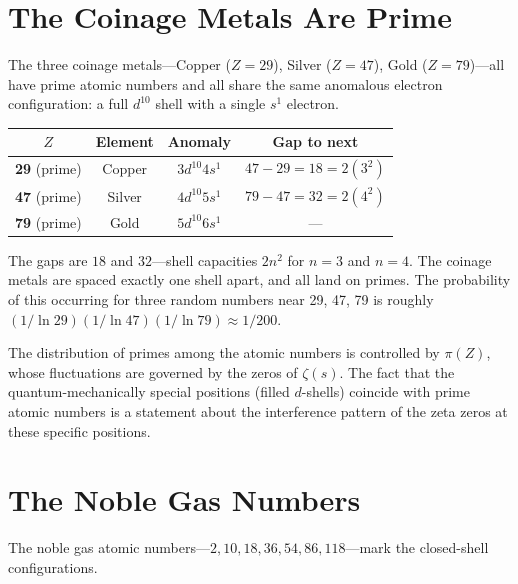 \documentclass[11pt,a4paper]{article}
\theoremstyle{definition}
\begin{document}
\section{The Coinage Metals Are Prime}
\label{sec:coinage}

The three coinage metals---Copper ($Z = 29$), Silver ($Z = 47$),
Gold ($Z = 79$)---all have prime atomic numbers and all share the
same anomalous electron configuration: a full $d^{10}$ shell with
a single $s^1$ electron.

\begin{center}
\begin{tabular}{@{}cccc@{}}
\toprule
$Z$ & Element & Anomaly & Gap to next \\
\midrule
\textbf{29} (prime) & Copper & $3d^{10}4s^1$ & $47 - 29 = 18 = 2(3^2)$ \\
\textbf{47} (prime) & Silver & $4d^{10}5s^1$ & $79 - 47 = 32 = 2(4^2)$ \\
\textbf{79} (prime) & Gold & $5d^{10}6s^1$ & --- \\
\bottomrule
\end{tabular}
\end{center}

The gaps are $18$ and $32$---shell capacities $2n^2$ for $n = 3$
and $n = 4$. The coinage metals are spaced exactly one shell apart,
and all land on primes. The probability of this occurring for three
random numbers near 29, 47, 79 is roughly
$(1/\ln 29)(1/\ln 47)(1/\ln 79) \approx 1/200$.

The distribution of primes among the atomic numbers is controlled by
$\pi(Z)$, whose fluctuations are governed by the zeros of $\zeta(s)$.
The fact that the quantum-mechanically special positions (filled
$d$-shells) coincide with prime atomic numbers is a statement about
the interference pattern of the zeta zeros at these specific positions.

\section{The Noble Gas Numbers}
\label{sec:noble}

The noble gas atomic numbers---$2, 10, 18, 36, 54, 86, 118$---mark
the closed-shell configurations.
\end{document}
